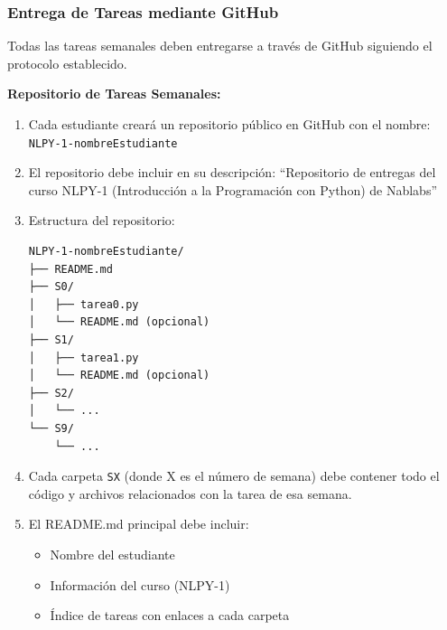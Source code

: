 \documentclass[12pt,letterpaper]{article}
\begin{document}
\subsubsection{Entrega de Tareas mediante GitHub}

\begin{infobox}
Todas las tareas semanales deben entregarse a través de GitHub siguiendo el protocolo establecido.
\end{infobox}

\textbf{Repositorio de Tareas Semanales:}
\begin{enumerate}[leftmargin=*]
    \item Cada estudiante creará un repositorio público en GitHub con el nombre: \texttt{NLPY-1-nombreEstudiante}
    
    \item El repositorio debe incluir en su descripción: ``Repositorio de entregas del curso NLPY-1 (Introducción a la Programación con Python) de Nablabs''
    
    \item Estructura del repositorio:
    
    {\small
    \begin{verbatim}
NLPY-1-nombreEstudiante/
├── README.md
├── S0/
│   ├── tarea0.py
│   └── README.md (opcional)
├── S1/
│   ├── tarea1.py
│   └── README.md (opcional)
├── S2/
│   └── ...
└── S9/
    └── ...
    \end{verbatim}
    }
    
    \item Cada carpeta \texttt{SX} (donde X es el número de semana) debe contener todo el código y archivos relacionados con la tarea de esa semana.
    
    \item El README.md principal debe incluir:
    \begin{itemize}
        \item Nombre del estudiante
        \item Información del curso (NLPY-1)
        \item Índice de tareas con enlaces a cada carpeta
    \end{itemize}
\end{enumerate}
\end{document}
